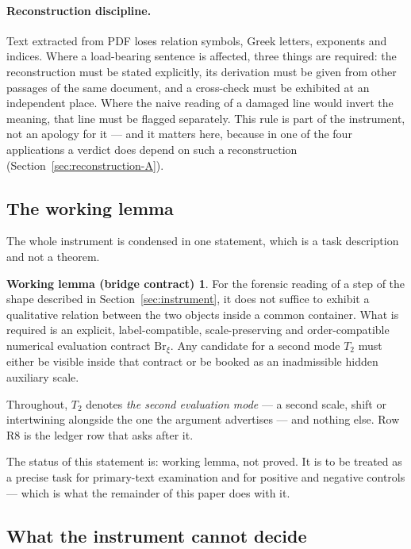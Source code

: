 \documentclass[11pt,a4paper]{article}
\theoremstyle{definition}
\newtheorem*{workinglemma}{Working lemma (bridge contract)}
\newcommand{\Brxi}{\mathrm{Br}_{\xi}}
\begin{document}
\paragraph{Reconstruction discipline.}
\label{sec:reconstruction}
Text extracted from PDF loses relation symbols, Greek letters, exponents and
indices. Where a load-bearing sentence is affected, three things are required:
the reconstruction must be stated explicitly, its derivation must be given from
other passages of the same document, and a cross-check must be exhibited at an
independent place. Where the naive reading of a damaged line would invert the
meaning, that line must be flagged separately. This rule is part of the
instrument, not an apology for it --- and it matters here, because in one of the
four applications a verdict does depend on such a reconstruction
(Section~\ref{sec:reconstruction-A}).

\subsection{The working lemma}

The whole instrument is condensed in one statement, which is a task description
and not a theorem.

\begin{workinglemma}
For the forensic reading of a step of the shape described in
Section~\ref{sec:instrument}, it does not suffice to exhibit a qualitative
relation between the two objects inside a common container. What is required is
an explicit, label-compatible, scale-preserving and order-compatible numerical
evaluation contract $\Brxi$. Any candidate for a second mode $T_2$ must either be
visible inside that contract or be booked as an inadmissible hidden auxiliary
scale.
\end{workinglemma}

Throughout, $T_2$ denotes \emph{the second evaluation mode} --- a second scale,
shift or intertwining alongside the one the argument advertises --- and nothing
else. Row R8 is the ledger row that asks after it.

The status of this statement is: working lemma, not proved. It is to be treated
as a precise task for primary-text examination and for positive and negative
controls --- which is what the remainder of this paper does with it.

\subsection{What the instrument cannot decide}
\label{sec:cannot}
\end{document}

